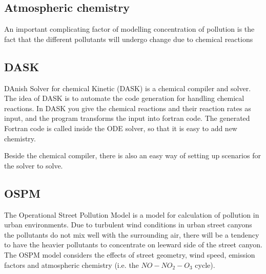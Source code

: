 \subsection{Atmospheric chemistry}
An important complicating factor of modelling concentration of pollution is the fact that the different pollutants will undergo change due to chemical reactions



\subsection{DASK}
DAnish Solver for chemical Kinetic (DASK) is a chemical compiler and solver. The idea of DASK is to automate the code generation for handling chemical reactions. In DASK you give the chemical reactions and their reaction rates as input, and the program transforms the input into fortran code. The generated Fortran code is called inside the ODE solver, so that it is easy to add new chemistry.

Beside the chemical compiler, there is also an easy way of setting up scenarios for the solver to solve. 
\subsection{OSPM}
The Operational Street Pollution Model is a model for calculation of pollution in urban environments. Due to turbulent wind conditions in urban street canyons the pollutants do not mix well with the surrounding air, there will be a tendency to have the heavier pollutants to concentrate on leeward side of the street canyon. The OSPM model considers the effects of street geometry, wind speed, emission factors and atmospheric chemistry (i.e. the $NO - NO_2 - O_3$ cycle).


